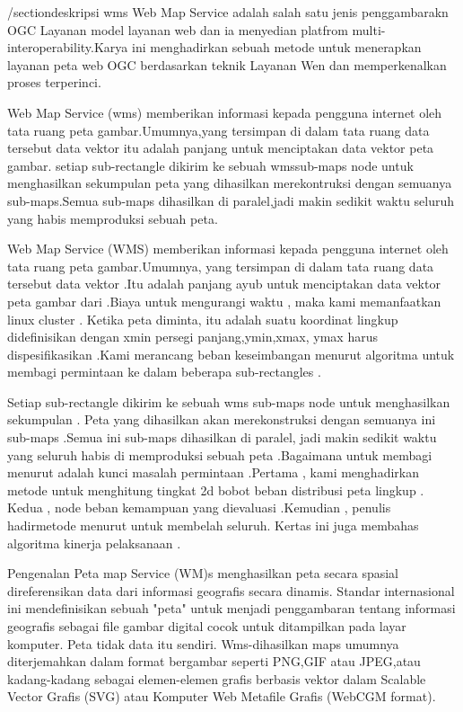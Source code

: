 
/section{deskripsi wms}
  Web Map Service adalah salah satu jenis penggambarakn OGC Layanan model layanan web dan ia menyedian platfrom
multi-interoperability.Karya ini menghadirkan sebuah metode untuk menerapkan layanan peta web OGC berdasarkan teknik
Layanan Wen dan memperkenalkan proses terperinci.
  
    Web Map Service (wms) memberikan informasi kepada pengguna internet oleh tata ruang peta gambar.Umumnya,yang tersimpan
di dalam tata ruang data tersebut data vektor itu adalah panjang untuk menciptakan data vektor peta gambar.
setiap sub-rectangle dikirim ke sebuah wmssub-maps node untuk menghasilkan sekumpulan peta yang dihasilkan merekontruksi
dengan semuanya sub-maps.Semua sub-maps dihasilkan di paralel,jadi makin sedikit waktu seluruh yang habis memproduksi
sebuah peta.

   Web Map Service (WMS) memberikan informasi kepada pengguna internet oleh tata ruang peta gambar.Umumnya,
yang tersimpan di dalam tata ruang data tersebut data vektor .Itu adalah panjang ayub untuk 
menciptakan data vektor peta gambar dari .Biaya untuk mengurangi waktu , maka kami memanfaatkan linux cluster .
Ketika peta diminta, itu adalah suatu koordinat lingkup didefinisikan dengan xmin persegi panjang,ymin,xmax, 
ymax harus dispesifikasikan .Kami merancang beban keseimbangan menurut algoritma untuk membagi permintaan ke dalam 
beberapa sub-rectangles .

   Setiap sub-rectangle dikirim ke sebuah wms sub-maps node untuk menghasilkan sekumpulan .
Peta yang dihasilkan akan merekonstruksi dengan semuanya ini sub-maps .Semua ini sub-maps dihasilkan di paralel, 
jadi makin sedikit waktu yang seluruh habis di memproduksi sebuah peta .Bagaimana untuk membagi menurut adalah 
kunci masalah permintaan .Pertama , kami menghadirkan metode untuk menghitung tingkat 2d bobot beban distribusi peta lingkup .
Kedua , node beban kemampuan yang dievaluasi .Kemudian , penulis hadirmetode menurut untuk membelah seluruh.
Kertas ini juga membahas algoritma kinerja pelaksanaan .

   Pengenalan Peta map Service (WM)s menghasilkan peta secara spasial direferensikan data dari informasi geografis secara dinamis. 
Standar internasional ini mendefinisikan sebuah "peta" untuk menjadi penggambaran tentang informasi geografis 
sebagai file gambar digital cocok untuk ditampilkan pada layar komputer. Peta tidak data itu sendiri. 
Wms-dihasilkan maps umumnya diterjemahkan dalam format bergambar seperti PNG,GIF atau JPEG,atau kadang-kadang sebagai
elemen-elemen grafis berbasis vektor dalam Scalable Vector Grafis (SVG) atau Komputer Web Metafile Grafis (WebCGM format).
